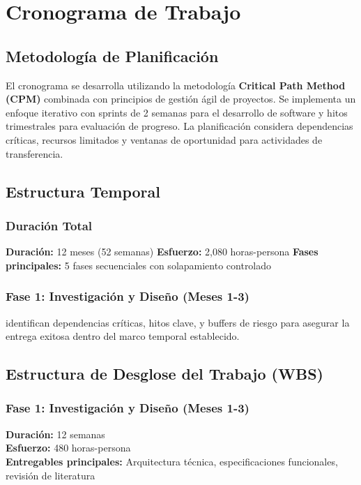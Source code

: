 \section{Cronograma de Trabajo}

\subsection{Metodología de Planificación}

El cronograma se desarrolla utilizando la metodología \textbf{Critical Path Method (CPM)} combinada con principios de gestión ágil de proyectos. Se implementa un enfoque iterativo con sprints de 2 semanas para el desarrollo de software y hitos trimestrales para evaluación de progreso. La planificación considera dependencias críticas, recursos limitados y ventanas de oportunidad para actividades de transferencia.

\subsection{Estructura Temporal}

\subsubsection{Duración Total}
\textbf{Duración:} 12 meses (52 semanas) 
\textbf{Esfuerzo:} 2,080 horas-persona 
\textbf{Fases principales:} 5 fases secuenciales con solapamiento controlado

\subsubsection{Fase 1: Investigación y Diseño (Meses 1-3)}identifican dependencias críticas, hitos clave, y buffers de riesgo para asegurar la entrega exitosa dentro del marco temporal establecido.

\subsection{Estructura de Desglose del Trabajo (WBS)}

\subsubsection{Fase 1: Investigación y Diseño (Meses 1-3)}
\textbf{Duración:} 12 semanas \\
\textbf{Esfuerzo:} 480 horas-persona \\
\textbf{Entregables principales:} Arquitectura técnica, especificaciones funcionales, revisión de literatura

